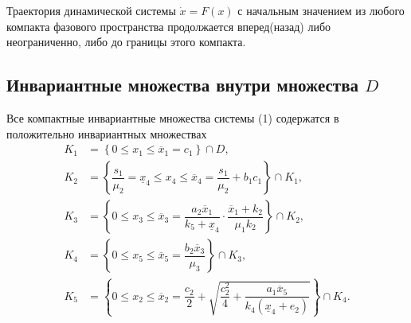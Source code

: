 \documentclass[14pt,a4paper]{extarticle}
\begin{document}
	\begin{theorem}\cite[с.~84]{Arnold}
		Траектория динамической системы $\dot{x}=F(x)$ с начальным значением из любого компакта фазового пространства продолжается вперед(назад) либо неограниченно, либо до границы этого компакта.
	\end{theorem}
	
	
	\subsection{Инвариантные множества внутри множества $D$}
	
	\begin{theorem}\label{th:inv_comp}
		Все компактные инвариантные множества системы (1) содержатся в положительно инвариантных множествах
		\begin{align*}
			K_1 &=\left\{0 \leqslant x_1 \leqslant \overline{x}_1 = c_1\right\}\cap D,\\[6pt]
			K_2 &=\left\{\dfrac{s_1}{\mu_2} = \underline{x}_4 \leqslant x_4 \leqslant \overline{x}_4 = \dfrac{s_1}{\mu_2} + b_1c_1\right\}\cap K_1,\\[6pt]
			K_3 &=\left\{0 \leqslant x_3 \leqslant \overline{x}_3 = \dfrac{a_2\overline{x}_1}{k_5+\underline{x}_4}\cdot\dfrac{\overline{x}_1+k_2}{\mu_1k_2}\right\}\cap K_2,\\[6pt]
			K_4 &=\left\{0 \leqslant x_5 \leqslant \overline{x}_5 = \dfrac{b_2\overline{x}_3}{\mu_3}\right\}\cap K_3,\\[6pt]
			K_5 &=\left\{0 \leqslant x_2 \leqslant \overline{x}_2 =  \dfrac{c_2}{2}+\sqrt{\dfrac{c_2^2}{4}+\dfrac{a_1\overline{x}_5}{k_4(\underline{x}_4+e_2)}}\right\}\cap K_4.
		\end{align*}
	\end{theorem}
\end{document}
